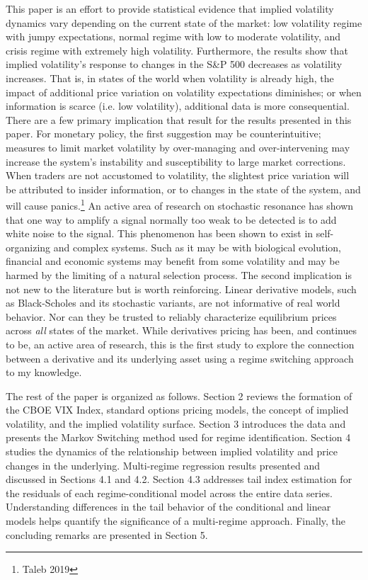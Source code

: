 \documentclass[11pt,a4paper,oldfontcommands]{memoir}
\begin{document}
{This paper is an effort to provide statistical evidence that implied volatility dynamics vary depending on the current state of the market: low volatility regime with jumpy expectations, normal regime with low to moderate volatility, and crisis regime with extremely high volatility. Furthermore, the results show that implied volatility’s response to changes in the S\&P 500 decreases as volatility increases. That is, in states of the world when volatility is already high, the impact of additional price variation on volatility expectations diminishes; or when information is scarce (i.e. low volatility), additional data is more consequential. There are a few primary implication that result for the results presented in this paper. For monetary policy, the first suggestion may be counterintuitive; measures to limit market volatility by over-managing and over-intervening may increase the system's instability and susceptibility to large market corrections. When traders are not accustomed to volatility, the slightest price variation will be attributed to insider information, or to changes in the state of the system, and will cause panics.\footnote{Taleb 2019} An active area of research on stochastic resonance has shown that one way to amplify a signal normally too weak to be detected is to add white noise to the signal. This phenomenon has been shown to exist in self-organizing and complex systems. Such as it may be with biological evolution, financial and economic systems may benefit from some volatility and may be harmed by the limiting of a natural selection process. The second implication is not new to the literature but is worth reinforcing. Linear derivative models, such as Black-Scholes and its stochastic variants, are not informative of real world behavior. Nor can they be trusted to reliably characterize equilibrium prices across \textit{all} states of the market. While derivatives pricing has been, and continues to be, an active area of research, this is the first study to explore the connection between a derivative and its underlying asset using a regime switching approach to my knowledge.

The rest of the paper is organized as follows. Section 2 reviews the formation of the CBOE VIX Index, standard options pricing models, the concept of implied volatility, and the implied volatility surface. Section 3 introduces the data and presents the Markov Switching method used for regime identification. Section 4 studies the dynamics of the relationship between implied volatility and price changes in the underlying. Multi-regime regression results presented and discussed in Sections 4.1 and 4.2. Section 4.3 addresses tail index estimation for the residuals of each regime-conditional model across the entire data series. Understanding differences in the tail behavior of the conditional and linear models helps quantify the significance of a multi-regime approach. Finally, the concluding remarks are presented in Section 5. 




}
\end{document}
